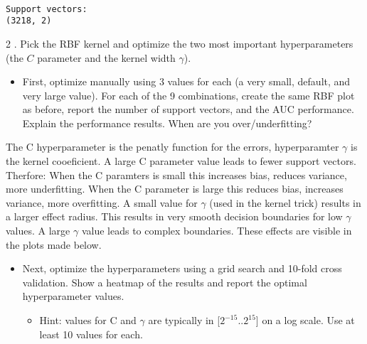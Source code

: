 \documentclass[11pt]{article}
\providecommand{\tightlist}{%
      \setlength{\itemsep}{0pt}\setlength{\parskip}{0pt}}
\begin{document}
    \begin{center}
    \end{center}
    { \hspace*{\fill} \\}
    
    \begin{Verbatim}[commandchars=\\\{\}]
Support vectors:
(3218, 2)

    \end{Verbatim}

    2 . Pick the RBF kernel and optimize the two most important
hyperparameters (the \(C\) parameter and the kernel width \(\gamma\)).

\begin{itemize}
\tightlist
\item
  First, optimize manually using 3 values for each (a very small,
  default, and very large value). For each of the 9 combinations, create
  the same RBF plot as before, report the number of support vectors, and
  the AUC performance. Explain the performance results. When are you
  over/underfitting?
\end{itemize}

The C hyperparameter is the penatly function for the errors,
hyperparamter \(\gamma\) is the kernel cooeficient. A large C parameter
value leads to fewer support vectors. Therfore: When the C paramters is
small this increases bias, reduces variance, more underfitting. When the
C parameter is large this reduces bias, increases variance, more
overfitting. A small value for \(\gamma\) (used in the kernel trick)
results in a larger effect radius. This results in very smooth decision
boundaries for low \(\gamma\) values. A large \(\gamma\) value leads to
complex boundaries. These effects are visible in the plots made below.

\begin{itemize}
\tightlist
\item
  Next, optimize the hyperparameters using a grid search and 10-fold
  cross validation. Show a heatmap of the results and report the optimal
  hyperparameter values.

  \begin{itemize}
  \tightlist
  \item
    Hint: values for C and \(\gamma\) are typically in
    {[}\(2^{-15}..2^{15}\){]} on a log scale. Use at least 10 values for
    each.
  \end{itemize}
\end{itemize}
\end{document}
